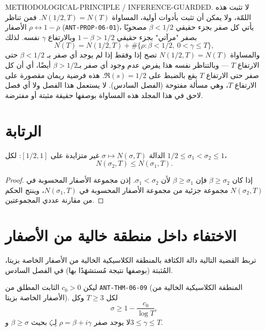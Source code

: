 \begin{remark}
\label{rem:density-half-equality-is-rh}
\noindent\textenglish{METHODOLOGICAL-PRINCIPLE / INFERENCE-GUARDED}.
لا تثبت هذه اللمّة، ولا يمكن أن تثبت بأدوات أولية، المساواة
\(N(1/2,T)=N(T)\). فمن تناظر الأصفار \(\rho\leftrightarrow1-\overline\rho\)
(\textenglish{\texttt{ANT-PROP-06-01}})، يأتي كل صفر بجزء حقيقي
\(\beta<1/2\) مصحوبًا بصفر "مرآتي" بجزء حقيقي \(1-\beta>1/2\) وبالارتفاع
\(\gamma\) نفسه. لذلك
\[
N(T)=N(1/2,T)+\#\{\rho:\beta<1/2,\ 0<\gamma\le T\},
\]
والمساواة \(N(1/2,T)=N(T)\) تصح إذا وفقط إذا لم يوجد أي صفر بـ
\(\beta<1/2\) حتى الارتفاع \(T\) — وبالتناظر نفسه هذا يفرض عدم وجود أي
صفر بـ\(\beta>1/2\) أيضًا، أي أن كل صفر حتى الارتفاع \(T\) يقع بالضبط
على \(\Re(s)=1/2\). هذه فرضية ريمان مقصورة على الارتفاع \(T\)، وهي مسألة
مفتوحة (الفصل السادس). لا يستعمل هذا الفصل ولا أي فصل لاحق في هذا
المجلد هذه المساواة بوصفها حقيقة مثبتة أو مفترضة.
\end{remark}

\section{الرتابة}

\begin{lemma}
\label{lem:density-monotone}
\provedhere
الدالة \(\sigma\mapsto N(\sigma,T)\) غير متزايدة على \([1/2,1]\): لكل
\(1/2\le\sigma_1<\sigma_2\le1\)،
\[
N(\sigma_2,T)\le N(\sigma_1,T).
\]
\end{lemma}

\begin{proof}
إذا كان \(\beta\ge\sigma_2\) فإن \(\beta\ge\sigma_1\) لأن
\(\sigma_1<\sigma_2\). إذن مجموعة الأصفار المحسوبة في \(N(\sigma_2,T)\)
مجموعة جزئية من مجموعة الأصفار المحسوبة في \(N(\sigma_1,T)\)، وينتج
الحكم من مقارنة عددي المجموعتين.
\end{proof}

\section{الاختفاء داخل منطقة خالية من الأصفار}

تربط القضية التالية دالة الكثافة بالمنطقة الكلاسيكية الخالية من الأصفار
الخاصة بزيتا، المُثبتة (بوصفها نتيجة مُستشهَدًا بها) في الفصل السادس.

\begin{proposition}
\label{prop:density-vanishes-in-zero-free-region}
\provedhere
ليكن \(c_0>0\) الثابت المطلق من \textenglish{\texttt{ANT-THM-06-09}}
(المنطقة الكلاسيكية الخالية من الأصفار الخاصة بزيتا). لكل \(T\ge3\)
وكل
\[
\sigma\ge1-\frac{c_0}{\log T},
\]
لا يوجد صفر \(\rho=\beta+i\gamma\) لِـ\(\zeta\) بحيث \(\beta\ge\sigma\)
و\(3\le\gamma\le T\).
\end{proposition}

